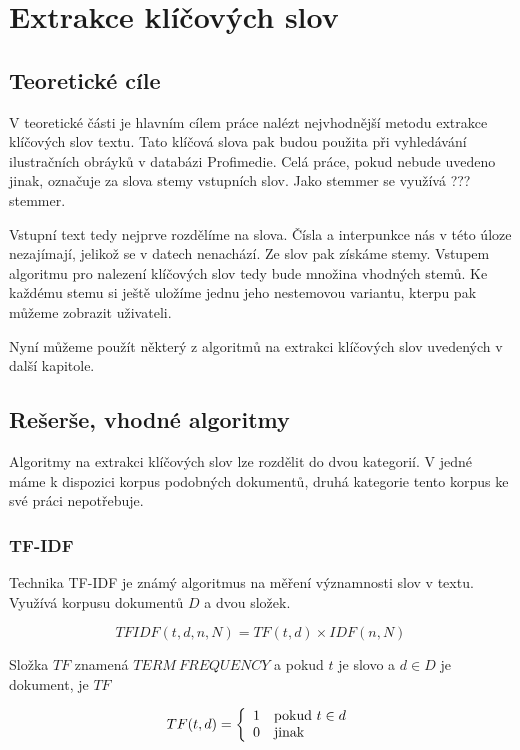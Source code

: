 \chapter{Extrakce klíčových slov}




\section{Teoretické cíle}

V teoretické části je hlavním cílem práce nalézt nejvhodnější metodu extrakce klíčových slov textu. Tato klíčová slova pak budou použita při vyhledávání ilustračních obráyků v databázi Profimedie. Celá práce, pokud nebude uvedeno jinak, označuje za slova stemy vstupních slov. Jako stemmer se využívá ??? stemmer.

Vstupní text tedy nejprve rozdělíme na slova. Čísla a interpunkce nás v této úloze nezajímají, jelikož se v datech nenachází. Ze slov pak získáme stemy. Vstupem algoritmu pro nalezení klíčových slov tedy bude množina vhodných stemů. Ke každému stemu si ještě uložíme jednu jeho nestemovou variantu, kterpu pak můžeme zobrazit uživateli.

Nyní můžeme použít některý z algoritmů na extrakci klíčových slov uvedených v další kapitole.

\section{Rešerše, vhodné algoritmy}

Algoritmy na extrakci klíčových slov lze rozdělit do dvou kategorií. V jedné máme k dispozici korpus podobných dokumentů, druhá kategorie tento korpus ke své práci nepotřebuje.

\subsection{TF-IDF}

Technika TF-IDF je známý algoritmus na měření významnosti slov v textu. Využívá korpusu dokumentů $D$ a dvou složek. 

\begin{equation}
  TFIDF(t,d,n,N)= TF(t,d)\times IDF(n,N)
\end{equation}

Složka $TF$ znamená $TERM\ FREQUENCY$ a pokud $t$ je slovo a $d \in D$ je dokument, je $TF$

\begin{equation}
 TF(t,d) = \left\{ \begin{array}{l l} 1 & \mathrm{pokud}\ t \in d \\
  0 & \mathrm{jinak} \end{array} \right.
\end{equation}

